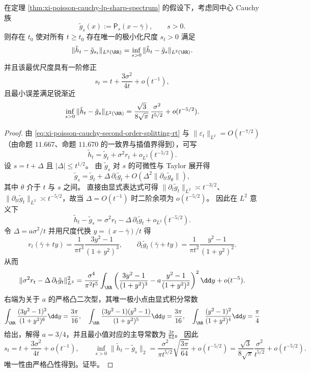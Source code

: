 \begin{theorem}\label{thm:xi-poisson-cauchy-l2-optimal-scale-halving}
在定理 \ref{thm:xi-poisson-cauchy-lp-sharp-spectrum} 的假设下，考虑同中心 Cauchy 族
\[
\tilde g_s(x):=\mathsf P_s(x-\bar\gamma),\qquad s>0.
\]
则存在 \(t_0\) 使对所有 \(t\ge t_0\) 存在唯一的极小化尺度 \(s_t>0\) 满足
\[
\|\tilde h_t-\tilde g_{s_t}\|_{L^2(\RR)}=\inf_{s>0}\|\tilde h_t-\tilde g_s\|_{L^2(\RR)}.
\]
并且该最优尺度具有一阶修正
\[
s_t=t+\frac{3\sigma^2}{4t}+o(t^{-1}),
\]
且最小误差满足锐渐近
\[
\inf_{s>0}\|\tilde h_t-\tilde g_s\|_{L^2(\RR)}
=\frac{\sqrt3}{8\sqrt\pi}\,\frac{\sigma^2}{t^{5/2}}+o(t^{-5/2}).
\]
\end{theorem}
\begin{proof}
由 \eqref{eq:xi-poisson-cauchy-second-order-splitting-rt} 与 \(\|\varepsilon_t\|_{L^2}=O(t^{-7/2})\)（由命题 \(11.667\)、命题 \(11.670\) 的一致界与插值界得到），可写
\[
\tilde h_t=\tilde g_t+\sigma^2 r_t+o_{L^2}(t^{-5/2}).
\]
设 \(s=t+\Delta\) 且 \(|\Delta|\le t^{1/2}\)。
由 \(\tilde g_s\) 对 \(s\) 的可微性与 Taylor 展开得
\[
\tilde g_s=\tilde g_t+\Delta\,\partial_t\tilde g_t+O\!\left(\Delta^2\|\partial_{tt}\tilde g_{\theta}\|\right),
\]
其中 \(\theta\) 介于 \(t\) 与 \(s\) 之间。
直接由显式表达式可得 \(\|\partial_t\tilde g_t\|_{L^2}\asymp t^{-3/2}\)、\(\|\partial_{tt}\tilde g_t\|_{L^2}\asymp t^{-5/2}\)，故当 \(\Delta=O(t^{-1})\) 时二阶余项为 \(o(t^{-5/2})\)。
因此在 \(L^2\) 意义下
\[
\tilde h_t-\tilde g_s
=\sigma^2 r_t-\Delta\,\partial_t\tilde g_t+o_{L^2}(t^{-5/2}).
\]
令 \(\Delta=a\sigma^2/t\) 并用尺度代换 \(y=(x-\bar\gamma)/t\) 得
\[
r_t(\bar\gamma+ty)=\frac{1}{\pi t^3}\frac{3y^2-1}{(1+y^2)^3},
\qquad
\partial_t\tilde g_t(\bar\gamma+ty)=\frac{1}{\pi t^2}\frac{y^2-1}{(1+y^2)^2}.
\]
从而
\[
\|\sigma^2 r_t-\Delta\,\partial_t\tilde g_t\|_{L^2}^2
=\frac{\sigma^4}{\pi^2 t^5}\int_{\RR}\left(\frac{3y^2-1}{(1+y^2)^3}-a\frac{y^2-1}{(1+y^2)^2}\right)^2\dd y+o(t^{-5}).
\]
右端为关于 \(a\) 的严格凸二次型，其唯一极小点由显式积分常数
\[
\int_{\RR}\frac{(3y^2-1)^2}{(1+y^2)^6}\dd y=\frac{3\pi}{16},
\quad
\int_{\RR}\frac{(3y^2-1)(y^2-1)}{(1+y^2)^5}\dd y=\frac{3\pi}{16},
\quad
\int_{\RR}\frac{(y^2-1)^2}{(1+y^2)^4}\dd y=\frac{\pi}{4}
\]
给出，解得 \(a=3/4\)，并且最小值对应的主导常数为 \(\frac{3\pi}{64}\)。
因此
\[
s_t=t+\frac{3\sigma^2}{4t}+o(t^{-1}),
\qquad
\inf_{s>0}\|\tilde h_t-\tilde g_s\|_{2}
=\frac{\sigma^2}{\pi t^{5/2}}\sqrt{\frac{3\pi}{64}}+o(t^{-5/2})
=\frac{\sqrt3}{8\sqrt\pi}\frac{\sigma^2}{t^{5/2}}+o(t^{-5/2}).
\]
唯一性由严格凸性得到。证毕。
\end{proof}

